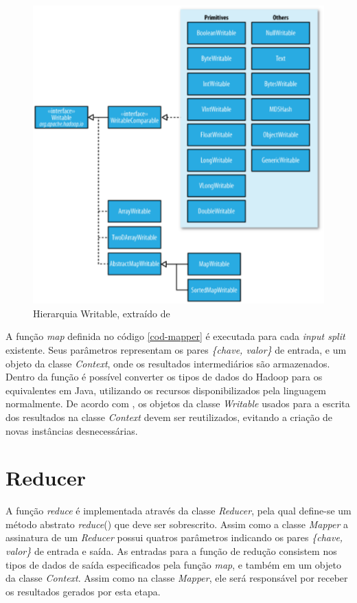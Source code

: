 \begin{figure}[ht!]
	\centering
	\includegraphics[keepaspectratio=true,scale=0.5]
	  {figuras/hadoop-writable.eps}
	\caption{Hierarquia Writable, extraído de }
	\label{fig-writable}
\end{figure}
\FloatBarrier

A função \textit{map} definida no código \ref{cod-mapper} é executada para cada \textit{input split} existente. Seus parâmetros representam os pares \textit{\{chave, valor\}} de entrada, e um objeto da classe \textit{Context}, onde os resultados intermediários são armazenados. Dentro da função é possível converter os tipos de dados do Hadoop para os equivalentes em Java, utilizando os recursos disponibilizados pela linguagem normalmente. De acordo com , os objetos da classe \textit{Writable} usados para a escrita dos resultados na classe \textit{Context} devem ser reutilizados, evitando a criação de novas instâncias desnecessárias.

\section{Reducer}

A função \textit{reduce} é implementada através da classe \textit{Reducer}, pela qual define-se um método abstrato \textit{reduce}() que deve ser sobrescrito. Assim como a classe \textit{Mapper} a assinatura de um \textit{Reducer} possui quatros parâmetros indicando os pares \textit{\{chave, valor\}} de entrada e saída. As entradas para a função de redução consistem nos tipos de dados de saída especificados pela função \textit{map}, e também em um objeto da classe \textit{Context}. Assim como na classe \textit{Mapper}, ele será responsável por receber os resultados gerados por esta etapa. 

